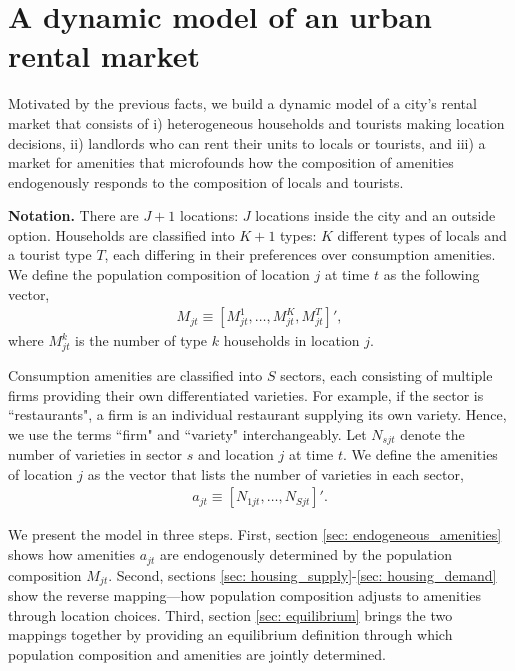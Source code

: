 \documentclass[11pt]{article}
\newcommand{\Paragraph}{\vspace{0.1cm}\noindent\textbf}
\begin{document}
\section{A dynamic model of an urban rental market}\label{sec: model}
Motivated by the previous facts, we build a dynamic model of a city's rental market that consists of i) heterogeneous households and tourists making location decisions, ii) landlords who can rent their units to locals or tourists, and iii) a market for amenities that microfounds how the composition of amenities endogenously responds to the composition of locals and tourists.

\Paragraph{Notation.} There are $J+1$ locations: $J$ locations inside the city and an outside option. Households are classified into $K+1$ types: $K$ different types of locals and a tourist type $T$, each differing in their preferences over consumption amenities. We define the population composition of location $j$ at time $t$ as the following vector,
\begin{align}\label{eq: pop composition definition M_jt}
    M_{jt} \equiv [M_{jt}^1,\dots, M_{jt}^K, M_{jt}^T]',
\end{align}
where $M_{jt}^k$ is the number of type $k$ households in location $j$.

Consumption amenities are classified into $S$ sectors, each consisting of multiple firms providing their own differentiated varieties. For example, if the sector is ``restaurants", a firm is an individual restaurant supplying its own variety. Hence, we use the terms ``firm" and ``variety" interchangeably. Let $N_{sjt}$ denote the number of varieties in sector $s$ and location $j$ at time $t$. We define the amenities of location $j$ as the vector that lists the number of varieties in each sector,
\begin{align}\label{eq: amenities definition a_jt}
    a_{jt} \equiv [N_{1jt},\dots, N_{Sjt}]'.
\end{align}

We present the model in three steps. First, section \ref{sec: endogeneous_amenities} shows how amenities $a_{jt}$ are endogenously determined by the population composition $M_{jt}$. Second, sections \ref{sec: housing_supply}-\ref{sec: housing_demand} show the reverse mapping---how population composition adjusts to amenities through location choices. Third, section \ref{sec: equilibrium} brings the two mappings together by providing an equilibrium definition through which population composition and amenities are jointly determined.
\end{document}
